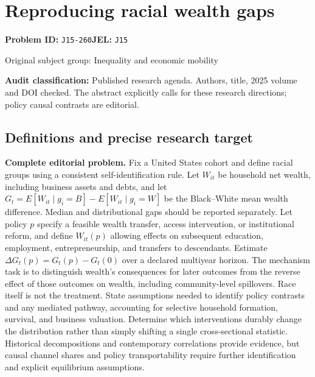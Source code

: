 \documentclass[11pt,a4paper]{article}
\begin{document}
\section*{Reproducing racial wealth gaps}
\textbf{Problem ID:} \texttt{J15-260}\quad \textbf{JEL:} \texttt{J15}\par
\label{problem:OP-0365}
{\sffamily\small\color{muted}Original subject group: Inequality and economic mobility\par}
\label{definitions:problem:30007647}
\textbf{Audit classification:} Published research agenda. Authors, title, 2025 volume and DOI checked. The abstract explicitly calls for these research directions; policy causal contrasts are editorial.
\subsection*{Definitions and precise research target}
\textbf{Complete editorial problem.} Fix a United States cohort and define racial groups using a consistent self-identification rule. Let \(W_{it}\) be household net wealth, including business assets and debts, and let \(G_t=E[W_{it}\mid g_i=B]-E[W_{it}\mid g_i=W]\) be the Black--White mean wealth difference. Median and distributional gaps should be reported separately. Let policy \(p\) specify a feasible wealth transfer, access intervention, or institutional reform, and define \(W_{it}(p)\) allowing effects on subsequent education, employment, entrepreneurship, and transfers to descendants. Estimate \(\Delta G_t(p)=G_t(p)-G_t(0)\) over a declared multiyear horizon. The mechanism task is to distinguish wealth's consequences for later outcomes from the reverse effect of those outcomes on wealth, including community-level spillovers. Race itself is not the treatment. State assumptions needed to identify policy contrasts and any mediated pathway, accounting for selective household formation, survival, and business valuation. Determine which interventions durably change the distribution rather than simply shifting a single cross-sectional statistic. Historical decompositions and contemporary correlations provide evidence, but causal channel shares and policy transportability require further identification and explicit equilibrium assumptions.
\end{document}
